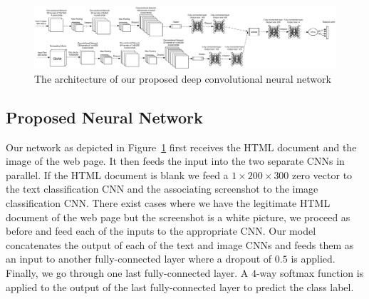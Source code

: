 \documentclass{article} %
\begin{document}
\begin{figure}
\centering
        \includegraphics[totalheight=3.2cm]{Combined}
    \caption{The architecture of our proposed deep convolutional neural network}
    \label{fig:CNN}
\end{figure}

\subsection{Proposed Neural Network}
  \label{ProposedNet}

Our network as depicted in Figure~\ref{fig:CNN} first receives the HTML document and the image of the web page. It then feeds the input into the two separate CNNs in parallel. If the HTML document is blank we feed a $1\times200\times300$ zero vector to the text classification CNN and the associating screenshot to the image classification CNN. There exist cases where we have the legitimate HTML document of the web page but the screenshot is a white picture, we proceed as before and feed each of the inputs to the appropriate CNN. Our model concatenates the output of each of the text and image CNNs and feeds
them as an input to another fully-connected layer where a dropout of $0.5$ is applied. Finally, we go through one last fully-connected layer. A $4$-way softmax function is applied to the output of the last fully-connected layer to predict the class label.
\end{document}

